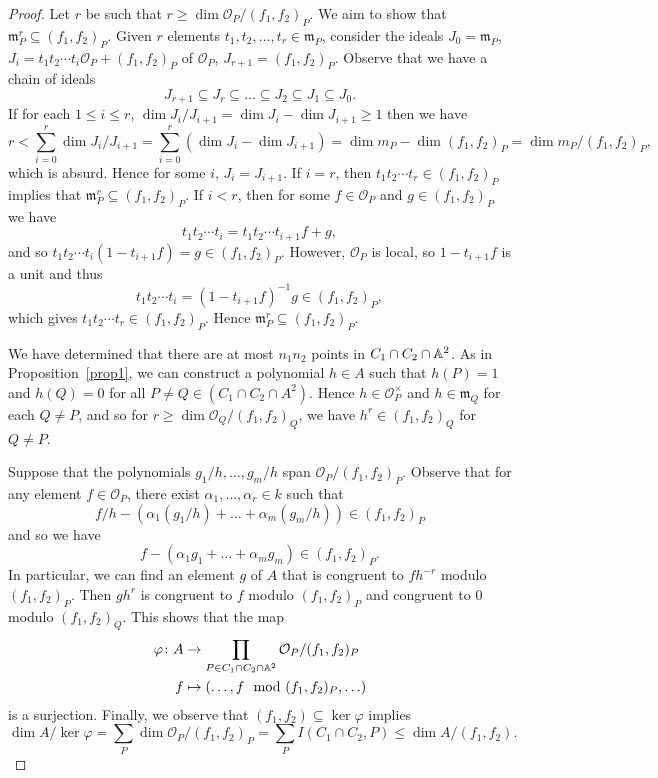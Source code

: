 \documentclass[10pt]{amsart}
\begin{document}
\begin{prop}
\begin{proof}
		Let $r$ be such that $r \geq \dim{\mathcal{O}_P/(f_1, f_2)_P}$.
		We aim to show that $\mathfrak{m}_P^r \subseteq (f_1, f_2)_P$.
		Given $r$ elements $t_1, t_2, \ldots, t_r \in \mathfrak{m}_P$, consider the ideals $J_0 = \mathfrak{m}_P$, $J_i = t_1t_2 \cdots t_i\mathcal{O}_P + (f_1, f_2)_P$ of $\mathcal{O}_P$, $J_{r + 1} = (f_1, f_2)_P.$
		Observe that we have a chain of ideals
		$$J_{r+1} \subseteq J_{r} \subseteq \ldots \subseteq J_2 \subseteq J_1 \subseteq J_0.$$
		If for each $1 \leq i \leq r$, $\dim{J_i/J_{i+1}} = \dim{J_i} - \dim{J_{i+1}} \geq 1$ then we have
			$$r < \sum_{i = 0}^r \dim{J_i/J_{i+1}}= \sum_{i = 0}^r \left(\dim{J_i} - \dim{J_{i+1}}\right) = \dim{m_P} - \dim{(f_1, f_2)_P} = \dim{m_P/(f_1, f_2)_P},$$
		which is absurd.
		Hence for some $i$, $J_i = J_{i+1}$.
		If $i = r$, then $t_1t_2 \cdots t_r \in (f_1, f_2)_P$ implies that $\mathfrak{m}_P^r \subseteq (f_1, f_2)_P$.
		If $i < r$, then for some $f \in \mathcal{O}_P$ and $g \in (f_1, f_2)_P$ we have
			$$t_1 t_2 \cdots t_i = t_1 t_2 \cdots t_{i+1}f + g,$$
		and so $t_1 t_2 \cdots t_i(1 - t_{i+1}f) = g \in (f_1, f_2)_P$.
		However, $\mathcal{O}_P$ is local, so $1 - t_{i+1}f$ is a unit and thus
			$$t_1 t_2 \cdots t_i = (1 - t_{i+1}f)^{-1}g \in (f_1, f_2)_P,$$
		which gives $t_1 t_2 \cdots t_r \in (f_1, f_2)_P$.
		Hence $\mathfrak{m}_P^r \subseteq (f_1, f_2)_P$.

		We have determined that there are at most $n_1n_2$ points in $C_1 \cap C_2 \cap \mathbb{A}^2$.
		As in Proposition~\ref{prop1}, we can construct a polynomial $h \in A$ such that $h(P) = 1$ and $h(Q) = 0$ for all $P \neq Q \in (C_1 \cap C_2 \cap A^2)$.
		Hence $h \in \mathcal{O}_P^\times$ and $h \in \mathfrak{m}_Q$ for each $Q \neq P$, and so for $r \geq \dim{\mathcal{O}_Q / (f_1, f_2)_Q}$, we have $h^r \in (f_1, f_2)_Q$ for $Q \neq P$.

		Suppose that the polynomials $g_1/h, \ldots, g_m/h$ span $\mathcal{O}_P/(f_1, f_2)_P$.
		Observe that for any element $f \in \mathcal{O}_P$, there exist $\alpha_1, \ldots, \alpha_r \in k$ such that
			$$f/h - (\alpha_1(g_1/h) + \ldots + \alpha_m(g_m/h)) \in (f_1, f_2)_P$$
		and so we have
			$$f - (\alpha_1g_1 + \ldots + \alpha_mg_m) \in (f_1, f_2)_P.$$
		In particular, we can find an element $g$ of $A$ that is congruent to $f  h^{-r}$ modulo $(f_1, f_2)_P$.
		Then $gh^r$ is congruent to $f$ modulo $(f_1, f_2)_P$ and congruent to 0 modulo $(f_1, f_2)_Q$.
		This shows that the map
		\begin{align*}
			\varphi \colon A &\rightarrow \prod_{P \in C_1 \cap C_2 \cap \mathbb{A}^2} \mathcal{O}_P/(f_1, f_2)_P\\
			f &\mapsto (\ldots, f \mod{ (f_1, f_2)_P}, \ldots)
		\end{align*}
		is a surjection.
		Finally, we observe that $(f_1, f_2) \subseteq \ker\varphi$ implies
			$$\dim{A/\ker\varphi} = \sum_{P} \dim{\mathcal{O}_P/(f_1, f_2)_P} = \sum_{P} I(C_1 \cap C_2, P) \leq \dim{A/(f_1, f_2)}.$$	
	\end{proof}
\end{prop}
\end{document}
